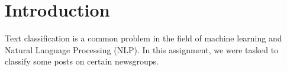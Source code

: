 \documentclass[12pt]{article}
\begin{document}
\maketitle
\section{Introduction}
Text classification is a common problem in the field of machine learning and Natural Language Processing (NLP). In this assignment, we were tasked to classify some posts on certain newsgroups.
\end{document}
